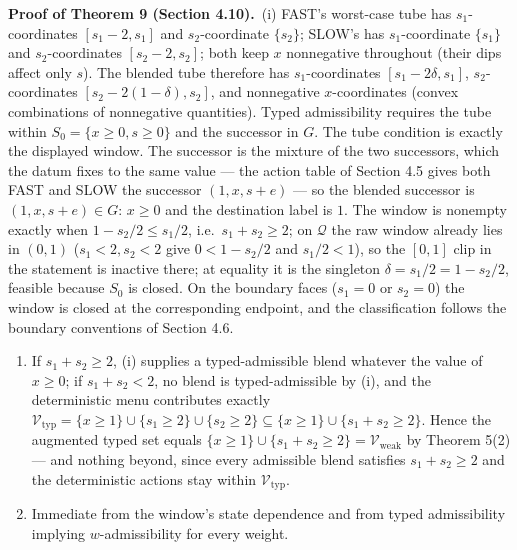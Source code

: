 \documentclass[3p,11pt]{elsarticle}
\begin{document}
\textbf{Proof of Theorem 9 (Section 4.10).}\ (i) FAST's worst-case tube has \(s_1\)-coordinates
\([s_1 - 2, s_1]\) and \(s_2\)-coordinate \(\{s_2\}\); SLOW's has
\(s_1\)-coordinate \(\{s_1\}\) and \(s_2\)-coordinates
\([s_2 - 2, s_2]\); both keep \(x\) nonnegative throughout (their dips
affect only \(s\)). The blended tube therefore has \(s_1\)-coordinates
\([s_1 - 2\delta, s_1]\), \(s_2\)-coordinates
\([s_2 - 2(1-\delta), s_2]\), and nonnegative \(x\)-coordinates (convex
combinations of nonnegative quantities). Typed admissibility requires
the tube within \(S_0 = \{x \ge 0, s \ge 0\}\) and the successor in
\(G\). The tube condition is exactly the displayed window. The successor
is the mixture of the two successors, which the datum fixes to the same
value --- the action table of Section 4.5 gives both FAST and SLOW the
successor \((1, x, s + e)\) --- so the blended successor is
\((1, x, s + e) \in G\): \(x \ge 0\) and the destination label is \(1\).
The window is nonempty exactly when \(1 - s_2/2 \le s_1/2\),
i.e.~\(s_1 + s_2 \ge 2\); on \(\mathcal{Q}\) the raw window already
lies in \((0,1)\) (\(s_1 < 2, s_2 < 2\) give \(0 < 1 - s_2/2\) and
\(s_1/2 < 1\)), so the \([0,1]\) clip in the statement is inactive
there; at equality it is the singleton
\(\delta = s_1/2 = 1 - s_2/2\), feasible because \(S_0\) is closed. On
the boundary faces (\(s_1 = 0\) or \(s_2 = 0\)) the window is closed at
the corresponding endpoint, and the classification follows the boundary
conventions of Section 4.6.

\begin{enumerate}
\def\labelenumi{(\roman{enumi})}
\setcounter{enumi}{1}
\item
  If \(s_1 + s_2 \ge 2\), (i) supplies a typed-admissible blend whatever
  the value of \(x \ge 0\); if \(s_1 + s_2 < 2\), no blend is
  typed-admissible by (i), and the deterministic menu contributes
  exactly
  \(\mathcal{V}_{\mathrm{typ}} = \{x \ge 1\} \cup \{s_1 \ge 2\} \cup \{s_2 \ge 2\} \subseteq \{x \ge 1\} \cup \{s_1 + s_2 \ge 2\}\).
  Hence the augmented typed set equals
  \(\{x \ge 1\} \cup \{s_1 + s_2 \ge 2\} = \mathcal{V}_{\mathrm{weak}}\)
  by Theorem 5(2) --- and nothing beyond, since every admissible blend
  satisfies \(s_1 + s_2 \ge 2\) and the deterministic actions stay
  within \(\mathcal{V}_{\mathrm{typ}}\).
\item
  Immediate from the window's state dependence and from typed
  admissibility implying \(w\)-admissibility for every weight.
\end{enumerate}
\end{document}
